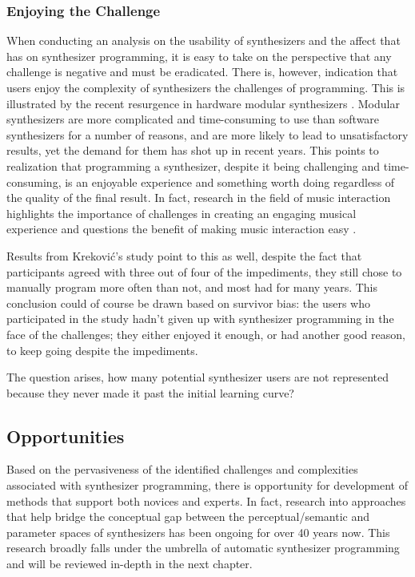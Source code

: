 \subsubsection{Enjoying the Challenge}
When conducting an analysis on the usability of synthesizers and the affect that has on synthesizer programming, it is easy to take on the perspective that any challenge is negative and must be eradicated. There is, however, indication that users enjoy the complexity of synthesizers the challenges of programming. This is illustrated by the recent resurgence in hardware modular synthesizers \cite{bates2021interface}. Modular synthesizers are more complicated and time-consuming to use than software synthesizers for a number of reasons, and are more likely to lead to unsatisfactory results, yet the demand for them has shot up in recent years. This points to realization that programming a synthesizer, despite it being challenging and time-consuming, is an enjoyable experience and something worth doing regardless of the quality of the final result. In fact, research in the field of music interaction \cite{holland2013music} highlights the importance of challenges in creating an engaging musical experience and questions the benefit of making music interaction easy \cite{mcdermott2013should}.

Results from Krekovi\'{c}'s study point to this as well, despite the fact that participants agreed with three out of four of the impediments, they still chose to manually program more often than not, and most had for many years. This conclusion could of course be drawn based on survivor bias: the users who participated in the study hadn't given up with synthesizer programming in the face of the challenges; they either enjoyed it enough, or had another good reason, to keep going despite the impediments. 

The question arises, how many potential synthesizer users are not represented because they never made it past the initial learning curve? 

\subsection{Opportunities}
Based on the pervasiveness of the identified challenges and complexities associated with synthesizer programming, there is opportunity for development of methods that support both novices and experts. In fact, research into approaches that help bridge the conceptual gap between the perceptual/semantic and parameter spaces of synthesizers has been ongoing for over 40 years now. This research broadly falls under the umbrella of automatic synthesizer programming and will be reviewed in-depth in the next chapter.

